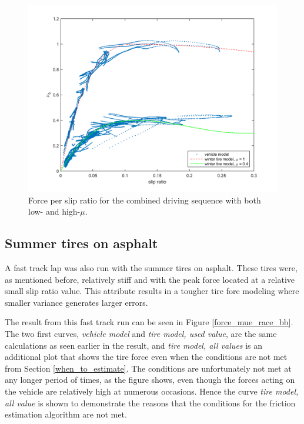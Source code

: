 \begin{figure}[h]
	\centering
	\includegraphics[width=1.0\textwidth]{Pictures/slip_kraft_comb2}
	\caption {Force per slip ratio for the combined driving sequence with both low- and high-$ \mu $.}
	\label{slip_kraft_comb2}
\end{figure}

\subsection{Summer tires on asphalt}
A fast track lap was also run with the summer tires on asphalt. These tires were, as mentioned before, relatively stiff and with the peak force located at a relative small slip ratio value. This attribute results in a tougher tire fore modeling where smaller variance generates larger errors.

The result from this fast track run can be seen in Figure \ref{force_mue_race_bb}. The two first curves, \textit{vehicle model} and \textit{tire model, used value}, are the same calculations as seen earlier in the result, and \textit{tire model, all values} is an additional plot that shows the tire force even when the conditions are not met from Section \ref{when_to_estimate}. The conditions are unfortunately not met at any longer period of times, as the figure shows, even though the forces acting on the vehicle are relatively high at numerous occasions. Hence the curve \textit{tire model, all value} is shown to demonstrate the reasons that the conditions for the friction estimation algorithm are not met.


